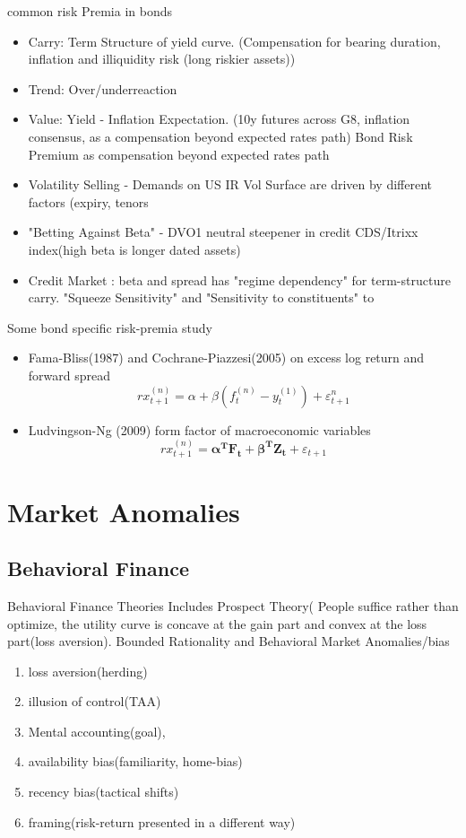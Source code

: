 \documentclass[11pt, openany]{book}              %
\begin{document}
common risk Premia in bonds

\begin{itemize}
	\item Carry: Term Structure of yield curve. (Compensation for bearing duration, inflation and illiquidity risk (long riskier assets))
	\item Trend: Over/underreaction
	\item Value: Yield - Inflation Expectation. (10y futures across G8, inflation consensus, as a compensation beyond expected rates path) Bond Risk Premium as compensation beyond expected rates path
	\item Volatility Selling - Demands on US IR Vol Surface are driven by different factors (expiry, tenors
	\item "Betting Against Beta" - DVO1 neutral steepener in credit CDS/Itrixx index(high beta is longer dated assets)
	\item Credit Market : beta and spread has "regime dependency" for term-structure carry. "Squeeze Sensitivity" and "Sensitivity to constituents" to 
\end{itemize}

Some bond specific risk-premia study

\begin{itemize}
	\item Fama-Bliss(1987) and Cochrane-Piazzesi(2005) on excess log return and forward spread
		$$rx_{t+1}^{(n)} = \alpha + \beta (f_t^{(n)} - y_t^{(1)}) + \varepsilon_{t+1}^n$$
	\item Ludvingson-Ng (2009) form factor of macroeconomic variables
	$$rx_{t+1}^{(n)} = \boldsymbol{\alpha^TF_t} + \boldsymbol{\beta^T Z_t} +\varepsilon_{t+1}$$
\end{itemize}


\section{Market Anomalies}

\subsection{Behavioral Finance}

Behavioral Finance Theories Includes Prospect Theory( People suffice rather than optimize, the utility curve is concave at the gain part and convex at the loss part(loss aversion). Bounded Rationality and 
Behavioral Market Anomalies/bias

\begin{enumerate}
 \item loss aversion(herding)
 \item illusion of control(TAA) 
 \item Mental accounting(goal),
 \item availability bias(familiarity, home-bias)
 \item recency bias(tactical shifts)
 \item framing(risk-return presented in a different way)
\end{enumerate}
\end{document}
